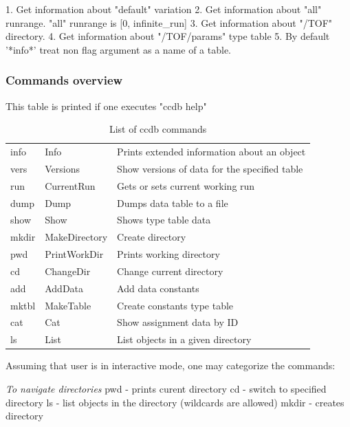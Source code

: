 \documentclass{article}
\begin{document}
1. Get information about "default" variation
2. Get information about "all" runrange. "all" runrange is [0, infinite\_run]
3. Get information about "/TOF" directory.
4. Get information about "/TOF/params" type table
5. By default '*info*' treat non flag argument as a name of a table.

\subsubsection{Commands overview}

This table is printed if one executes "ccdb help"
\begin{table}[position specifier]
\centering
\begin{tabular}{| l | l | l |}
  \hline
  info   & Info          & Prints extended information about an object \\
  vers   & Versions      & Show versions of data for the specified table \\
  run    & CurrentRun    & Gets or sets current working run \\
  dump   & Dump          & Dumps data table to a file \\
  show   & Show          & Shows type table data \\
  mkdir  & MakeDirectory & Create directory \\
  pwd    & PrintWorkDir  & Prints working directory \\
  cd     & ChangeDir     & Change current directory \\
  add    & AddData       & Add data constants \\
  mktbl  & MakeTable     & Create constants type table \\
  cat    & Cat           & Show assignment data by ID \\
  ls     & List          & List objects in a given directory \\
  \hline
\end{tabular}
\caption{List of ccdb commands}
\label{tab:commands}
\end{table}

Assuming that user is in interactive mode, one may categorize the commands:


\emph{To navigate directories}
pwd - prints curent directory
cd  - switch to specified directory
ls  - list objects in the directory (wildcards are allowed)
mkdir - creates directory
\end{document}
